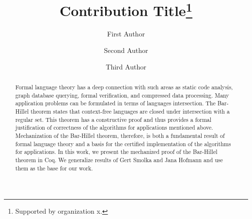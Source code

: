 \documentclass[runningheads]{llncs}
\begin{document}
%
\title{Contribution Title\thanks{Supported by organization x.}}
%
%
\author{First Author \and
Second Author \and
Third Author}
%
%
%
\maketitle              %
%
\begin{abstract}
Formal language theory has a deep connection with such areas as static code analysis, graph database querying, formal verification, and compressed data processing.
Many application problems can be formulated in terms of languages intersection.
The Bar-Hillel theorem states that context-free languages are closed under intersection with a regular set.
This theorem has a constructive proof and thus provides a formal justification of correctness of the algorithms for applications mentioned above. 
Mechanization of the Bar-Hillel theorem, therefore, is both a fundamental result of formal language theory and a basis for the certified implementation of the algorithms for applications.
In this work, we present the mechanized proof of the Bar-Hillel theorem in Coq.
We generalize results of Gert Smolka and Jana Hofmann and use them as the base for our work.

\end{abstract}
%
%
%







%
%
%
 
 
%
\end{document}
